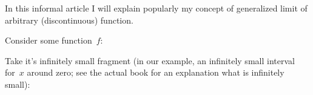 \documentclass[pstricks,border=12pt]{amsart}
\begin{document}
In this informal article I will explain popularly my concept of generalized limit of arbitrary (discontinuous) function.

Consider some function~$f$:

\begin{figure}[ht]
\end{figure}

Take it's infinitely small fragment (in our example, an infinitely small interval for~$x$ around zero; see the actual book for an explanation what is infinitely small):

\begin{figure}[ht]
\end{figure}
\end{document}
